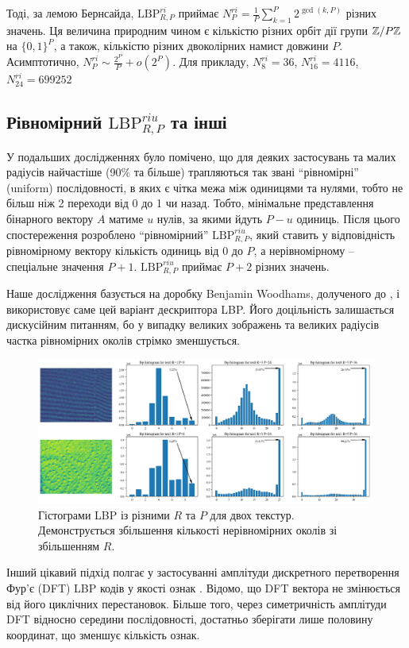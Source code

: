 Тоді, за лемою Бернсайда, $\mathrm{LBP}^{ri}_{R,P}$ приймає $N^{ri}_P = \frac{1}{P}\sum_{k=1}^P 2^{\operatorname{gcd}(k,P)}$ різних значень. 
Ця величина природним чином є кількістю різних орбіт дії групи $\mathbb Z/P\mathbb Z$ на $\{0,1\}^P$, а також, кількістю різних двоколірних намист довжини $P$.
Асимптотично, $N^{ri}_P \sim \frac{2^P}{P} + o(2^P)$. 
Для прикладу, $N^{ri}_8 = 36$, $N^{ri}_{16} = 4116$, $N^{ri}_{24} = 699252$

\subsection{Рівномірний \(\mathrm{LBP}_{R,P}^{riu}\) та інші}\label{section1.1d}\hfill

У подальших дослідженнях \cite{ojala2002} було помічено, що для деяких застосувань та малих радіусів найчастіше (90\% та більше) трапляються так звані ``рівномірні'' (uniform) послідовності, 
в яких є чітка межа між одиницями та нулями, тобто не більш ніж 2 переходи від 0 до 1 чи назад. 
Тобто, мінімальне представлення бінарного вектору $A$ матиме $u$ нулів, за якими йдуть $P-u$ одиниць.
Після цього спостереження розроблено ``рівномірний'' $\mathrm{LBP}^{riu}_{R,P}$, 
який ставить у відповідність рівномірному вектору кількість одиниць від $0$ до $P$, а нерівномірному -- спеціальне значення $P+1$.
$\mathrm{LBP}^{riu}_{R,P}$ приймає $P+2$ різних значень.

Наше дослідження \cite{fastlbp2024} базується на доробку Benjamin Woodhams, долученого до \cite{lee2025integrated}, і використовує саме цей варіант дескриптора LBP.
Його доцільність залишається дискусійним питанням, бо у випадку великих зображень та великих радіусів 
частка рівномірних околів стрімко зменшується.

\begin{figure}[h]
    \centering
    \includegraphics[width=0.99\textwidth]{img/cloth-hist-lbpu.jpg}
    \caption{
        Гістограми LBP із різними $R$ та $P$ для двох текстур.
        Демонструється збільшення кількості нерівномірних околів зі збільшенням $R$.
    }
    \label{fig:cloth-hist-lbpu}
\end{figure}

Інший цікавий підхід полгає у застосуванні амплітуди дискретного перетворення Фур'є (DFT) LBP кодів у якості ознак \cite{arof1998, haley1999}.
Відомо, що DFT вектора не змінюється від його циклічних перестановок. 
Більше того, через симетричність амплітуди DFT відносно середини послідовності, достатньо зберігати лише половину координат, що зменшує кількість ознак. 

